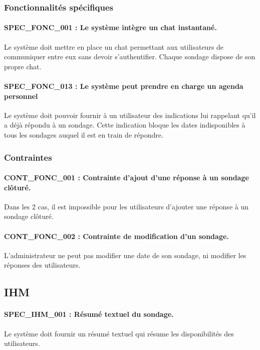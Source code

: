 \documentclass[titlepage]{report}
\begin{document}
\subsubsection{Fonctionnalités spécifiques}

\paragraph{SPEC\_FONC\_001 : Le système intègre un chat instantané.}
Le système doit mettre en place un chat permettant aux utilisateurs de communiquer entre eux sans devoir s’authentifier. Chaque sondage dispose de son propre chat.

\paragraph{SPEC\_FONC\_013 : Le système peut prendre en charge un agenda personnel}
Le système doit pouvoir fournir à un utilisateur des indications lui rappelant qu’il a déjà répondu à un sondage. Cette indication bloque les dates indisponibles à tous les sondages auquel il est en train de répondre.

\subsubsection{Contraintes}
\paragraph{CONT\_FONC\_001 : Contrainte d’ajout d’une réponse à un sondage clôturé.}
Dans les 2 cas, il est impossible pour les utilisateurs d’ajouter une réponse à un sondage clôturé.

\paragraph{CONT\_FONC\_002 : Contrainte de modification d’un sondage.}
L’administrateur ne peut pas modifier une date de son sondage, ni modifier les réponses des utilisateurs.

\subsection{IHM}

\paragraph{SPEC\_IHM\_001 : Résumé textuel du sondage.}
Le système doit fournir un résumé textuel qui résume les disponibilités des utilisateurs.
\end{document}
